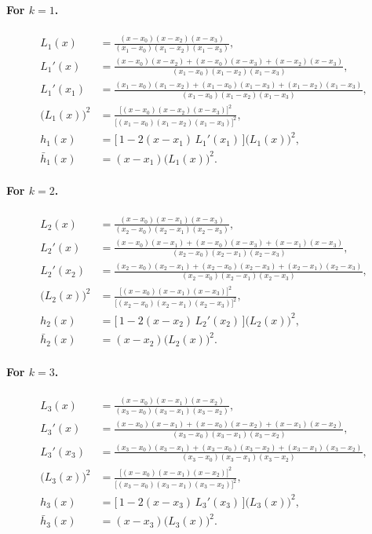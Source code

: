 \documentclass[12pt,a4paper]{article}
\begin{document}
\paragraph{For $k=1$.}
\begin{align*}
  L_1(x) &= \frac{(x-x_0)(x-x_2)(x-x_3)}{(x_1-x_0)(x_1-x_2)(x_1-x_3)}, \\[4pt]
  L_1'(x) &= \frac{(x-x_0)(x-x_2) + (x-x_0)(x-x_3) + (x-x_2)(x-x_3)}{(x_1-x_0)(x_1-x_2)(x_1-x_3)}, \\[4pt]
  L_1'(x_1) &= \frac{(x_1-x_0)(x_1-x_2) + (x_1-x_0)(x_1-x_3) + (x_1-x_2)(x_1-x_3)}{(x_1-x_0)(x_1-x_2)(x_1-x_3)}, \\[4pt]
  \bigl(L_1(x)\bigr)^2 &= \frac{\bigl[(x-x_0)(x-x_2)(x-x_3)\bigr]^2}{\bigl[(x_1-x_0)(x_1-x_2)(x_1-x_3)\bigr]^2}, \\[4pt]
  h_1(x) &= \bigl[\,1 - 2(x-x_1)\,L_1'(x_1)\,\bigr]\bigl(L_1(x)\bigr)^2, \\[4pt]
  \bar{h}_1(x) &= (x-x_1)\bigl(L_1(x)\bigr)^2.
\end{align*}
 
\paragraph{For $k=2$.}
\begin{align*}
  L_2(x) &= \frac{(x-x_0)(x-x_1)(x-x_3)}{(x_2-x_0)(x_2-x_1)(x_2-x_3)}, \\[4pt]
  L_2'(x) &= \frac{(x-x_0)(x-x_1) + (x-x_0)(x-x_3) + (x-x_1)(x-x_3)}{(x_2-x_0)(x_2-x_1)(x_2-x_3)}, \\[4pt]
  L_2'(x_2) &= \frac{(x_2-x_0)(x_2-x_1) + (x_2-x_0)(x_2-x_3) + (x_2-x_1)(x_2-x_3)}{(x_2-x_0)(x_2-x_1)(x_2-x_3)}, \\[4pt]
  \bigl(L_2(x)\bigr)^2 &= \frac{\bigl[(x-x_0)(x-x_1)(x-x_3)\bigr]^2}{\bigl[(x_2-x_0)(x_2-x_1)(x_2-x_3)\bigr]^2}, \\[4pt]
  h_2(x) &= \bigl[\,1 - 2(x-x_2)\,L_2'(x_2)\,\bigr]\bigl(L_2(x)\bigr)^2, \\[4pt]
  \bar{h}_2(x) &= (x-x_2)\bigl(L_2(x)\bigr)^2.
\end{align*}
 
\paragraph{For $k=3$.}
\begin{align*}
  L_3(x) &= \frac{(x-x_0)(x-x_1)(x-x_2)}{(x_3-x_0)(x_3-x_1)(x_3-x_2)}, \\[4pt]
  L_3'(x) &= \frac{(x-x_0)(x-x_1) + (x-x_0)(x-x_2) + (x-x_1)(x-x_2)}{(x_3-x_0)(x_3-x_1)(x_3-x_2)}, \\[4pt]
  L_3'(x_3) &= \frac{(x_3-x_0)(x_3-x_1) + (x_3-x_0)(x_3-x_2) + (x_3-x_1)(x_3-x_2)}{(x_3-x_0)(x_3-x_1)(x_3-x_2)}, \\[4pt]
  \bigl(L_3(x)\bigr)^2 &= \frac{\bigl[(x-x_0)(x-x_1)(x-x_2)\bigr]^2}{\bigl[(x_3-x_0)(x_3-x_1)(x_3-x_2)\bigr]^2}, \\[4pt]
  h_3(x) &= \bigl[\,1 - 2(x-x_3)\,L_3'(x_3)\,\bigr]\bigl(L_3(x)\bigr)^2, \\[4pt]
  \bar{h}_3(x) &= (x-x_3)\bigl(L_3(x)\bigr)^2.
\end{align*}
 
\end{document}
